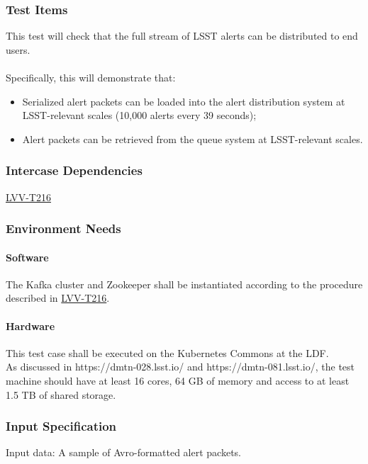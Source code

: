 \subsubsection{Test Items}
This test will check that the full stream of LSST alerts can be
distributed to end users.\\
~\\
Specifically, this will demonstrate that:

\begin{itemize}
\tightlist
\item
  Serialized alert packets can be loaded into the alert distribution
  system at LSST-relevant scales (10,000 alerts every 39 seconds);
\item
  Alert packets can be retrieved from the queue system at LSST-relevant
  scales.
\end{itemize}



\subsubsection{Intercase Dependencies}
\href{https://jira.lsstcorp.org/secure/Tests.jspa\#/testCase/LVV-T216}{LVV-T216}


\subsubsection{Environment Needs}

\paragraph{Software}
The Kafka cluster and Zookeeper shall be instantiated according to the
procedure described in
\href{https://jira.lsstcorp.org/secure/Tests.jspa\#/testCase/LVV-T216}{LVV-T216}.


\paragraph{Hardware}
This test case shall be executed on the Kubernetes Commons at the LDF.\\
As discussed in https://dmtn-028.lsst.io/ and https://dmtn-081.lsst.io/,
the test machine should have at least 16 cores, 64 GB of memory and
access to at least 1.5 TB of shared storage.


\subsubsection{Input Specification}
Input data: A sample of Avro-formatted alert packets.


